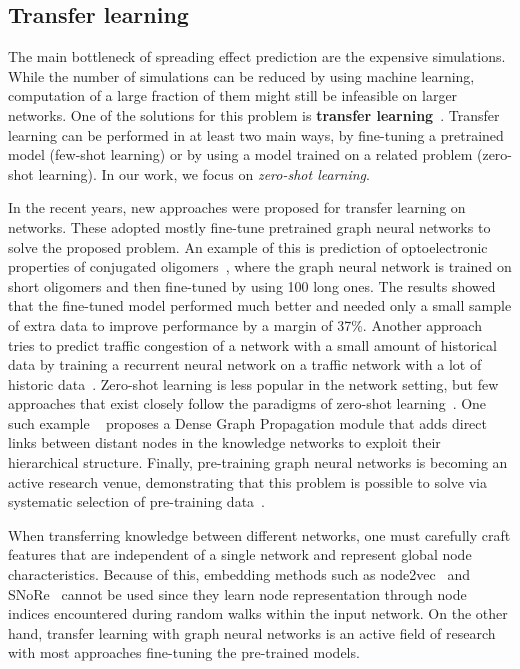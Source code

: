 \documentclass{article}
\begin{document}
\subsection{Transfer learning}
The main bottleneck of spreading effect prediction are the expensive simulations. While the number of simulations can be reduced by using machine learning, computation of a large fraction of them might still be infeasible on larger networks. One of the solutions for this problem is \textbf{transfer learning}~\cite{zhuang2020comprehensive}. Transfer learning can be performed in at least two main ways, by fine-tuning a pretrained model (few-shot learning) or by using a model trained on a related problem (zero-shot learning). In our work, we focus on \emph{zero-shot learning}.

In the recent years, new approaches were proposed for transfer learning on networks. These adopted mostly fine-tune pretrained graph neural networks to solve the proposed problem. An example of this is prediction of optoelectronic properties of conjugated oligomers~\cite{lee2021transfer}, where the graph neural network is trained on short oligomers and then fine-tuned by using 100 long ones. The results showed that the fine-tuned model performed much better and needed only a small sample of extra data to improve performance by a margin of 37\%. Another approach tries to predict traffic congestion of a network with a small amount of historical data by training a recurrent neural network on a traffic network with a lot of historic data~\cite{Mallick2020TransferLW}. Zero-shot learning is less popular in the network setting, but few approaches that exist closely follow the paradigms of zero-shot learning~\cite{wang2019zerosurvey}. One such example ~\cite{Kampffmeyer_2019_CVPR} proposes a Dense Graph Propagation module that adds direct links between distant nodes in the knowledge networks to exploit their hierarchical structure. Finally, pre-training graph neural networks is becoming an active research venue, demonstrating that this problem is possible to solve via systematic selection of pre-training data~\cite{qiu2020gcc,hu2019strategies}.
 
When transferring knowledge between different networks, one must carefully craft features that are independent of a single network and represent global node characteristics. Because of this, embedding methods such as node2vec~\cite{grover2016node2vec} and SNoRe~\cite{meznar2020snore} cannot be used since they learn node representation through node indices encountered during random walks within the input network. On the other hand, transfer learning with graph neural networks is an active field of research with most approaches fine-tuning the pre-trained models.
\end{document}
